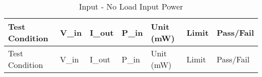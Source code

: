 \begin{longtable}{lllllll}
\caption{Input - No Load Input Power} \\
\hline
Test Condition & V_in & I_out & P_in & Unit (mW) & Limit & Pass/Fail \\
\hline
\endfirsthead

\hline
Test Condition & V_in & I_out & P_in & Unit (mW) & Limit & Pass/Fail \\
\hline
\endhead


\hline
\end{longtable}